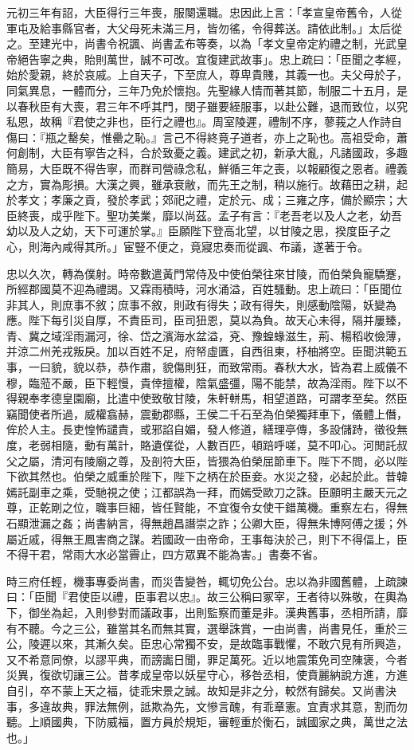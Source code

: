 \begin{pinyinscope}
元初三年有詔，大臣得行三年喪，服闋還職。忠因此上言：「孝宣皇帝舊令，人從軍屯及給事縣官者，大父母死未滿三月，皆勿徭，令得葬送。請依此制。」太后從之。至建光中，尚書令祝諷、尚書孟布等奏，以為「孝文皇帝定約禮之制，光武皇帝絕告寧之典，貽則萬世，誠不可改。宜復建武故事」。忠上疏曰：「臣聞之孝經，始於愛親，終於哀戚。上自天子，下至庶人，尊卑貴賤，其義一也。夫父母於子，同氣異息，一體而分，三年乃免於懷抱。先聖緣人情而著其節，制服二十五月，是以春秋臣有大喪，君三年不呼其門，閔子雖要絰服事，以赴公難，退而致位，以究私恩，故稱『君使之非也，臣行之禮也』。周室陵遲，禮制不序，蓼莪之人作詩自傷曰：『瓶之罊矣，惟罍之恥。』言己不得終竟子道者，亦上之恥也。高祖受命，蕭何創制，大臣有寧告之科，合於致憂之義。建武之初，新承大亂，凡諸國政，多趣簡易，大臣既不得告寧，而群司營祿念私，鮮循三年之喪，以報顧復之恩者。禮義之方，實為彫損。大漢之興，雖承衰敝，而先王之制，稍以施行。故藉田之耕，起於孝文；孝廉之貢，發於孝武；郊祀之禮，定於元、成；三雍之序，備於顯宗；大臣終喪，成乎陛下。聖功美業，靡以尚茲。孟子有言：『老吾老以及人之老，幼吾幼以及人之幼，天下可運於掌。』臣願陛下登高北望，以甘陵之思，揆度臣子之心，則海內咸得其所。」宦豎不便之，竟寢忠奏而從諷、布議，遂著于令。

忠以久次，轉為僕射。時帝數遣黃門常侍及中使伯榮往來甘陵，而伯榮負寵驕蹇，所經郡國莫不迎為禮謁。又霖雨積時，河水涌溢，百姓騷動。忠上疏曰：「臣聞位非其人，則庶事不敘；庶事不敘，則政有得失；政有得失，則感動陰陽，妖變為應。陛下每引災自厚，不責臣司，臣司狃恩，莫以為負。故天心未得，隔并屢臻，青、冀之域淫雨漏河，徐、岱之濱海水盆溢，兗、豫蝗蝝滋生，荊、楊稻收儉薄，并涼二州羌戎叛戾。加以百姓不足，府帑虛匱，自西徂東，杼柚將空。臣聞洪範五事，一曰貌，貌以恭，恭作肅，貌傷則狂，而致常雨。春秋大水，皆為君上威儀不穆，臨蒞不嚴，臣下輕慢，貴倖擅權，陰氣盛彊，陽不能禁，故為淫雨。陛下以不得親奉孝德皇園廟，比遣中使致敬甘陵，朱軒軿馬，相望道路，可謂孝至矣。然臣竊聞使者所過，威權翕赫，震動郡縣，王侯二千石至為伯榮獨拜車下，儀體上僭，侔於人主。長吏惶怖譴責，或邪諂自媚，發人修道，繕理亭傳，多設儲跱，徵役無度，老弱相隨，動有萬計，賂遺僕從，人數百匹，頓踣呼嗟，莫不叩心。河閒託叔父之屬，清河有陵廟之尊，及剖符大臣，皆猥為伯榮屈節車下。陛下不問，必以陛下欲其然也。伯榮之威重於陛下，陛下之柄在於臣妾。水災之發，必起於此。昔韓嫣託副車之乘，受馳視之使；江都誤為一拜，而嫣受歐刀之誅。臣願明主嚴天元之尊，正乾剛之位，職事巨細，皆任賢能，不宜復令女使干錯萬機。重察左右，得無石顯泄漏之姦；尚書納言，得無趙昌譖崇之詐；公卿大臣，得無朱博阿傅之援；外屬近戚，得無王鳳害商之謀。若國政一由帝命，王事每決於己，則下不得偪上，臣不得干君，常雨大水必當霽止，四方眾異不能為害。」書奏不省。

時三府任輕，機事專委尚書，而災眚變咎，輒切免公台。忠以為非國舊體，上疏諫曰：「臣聞『君使臣以禮，臣事君以忠』。故三公稱曰冢宰，王者待以殊敬，在輿為下，御坐為起，入則參對而議政事，出則監察而董是非。漢典舊事，丞相所請，靡有不聽。今之三公，雖當其名而無其實，選舉誅賞，一由尚書，尚書見任，重於三公，陵遲以來，其漸久矣。臣忠心常獨不安，是故臨事戰懼，不敢穴見有所興造，又不希意同僚，以謬平典，而謗讟日聞，罪足萬死。近以地震策免司空陳褒，今者災異，復欲切讓三公。昔孝成皇帝以妖星守心，移咎丞相，使賁麗納說方進，方進自引，卒不蒙上天之福，徒乖宋景之誠。故知是非之分，較然有歸矣。又尚書決事，多違故典，罪法無例，詆欺為先，文慘言醜，有乖章憲。宜責求其意，割而勿聽。上順國典，下防威福，置方員於規矩，審輕重於衡石，誠國家之典，萬世之法也。」


\end{pinyinscope}
